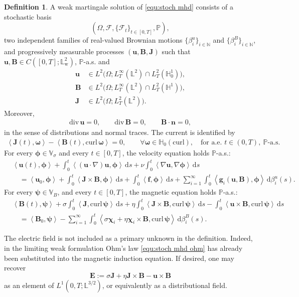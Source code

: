 \documentclass[11pt, reqno]{amsart}
\theoremstyle{definition}
\newtheorem{definition}[theorem]{Definition}
\numberwithin{equation}{section}
\newcommand{\curl}{\mathrm{curl}\,}
\newcommand{\divg}{\mathrm{div}\,}
\newcommand{\bff}{\boldsymbol}
\newcommand{\bb}{\mathbb}
\newcommand{\ds}{\,\mathrm{d}s}
\newcommand{\dbeta}{\mathrm{d}\beta}
\newcommand{\inpro}[2]{\left\langle#1,#2\right\rangle}
\newcommand{\hzerocurl}{\mathbb{H}_0(\mathrm{curl})}
\begin{document}
\begin{definition}\label{def:weak sol}
A weak martingale solution of \eqref{equ:stoch mhd} consists of a stochastic
basis
\[
(\Omega,\mathscr F,\{\mathscr F_t\}_{t\in[0,T]},\bb P),
\]
two independent families of real-valued Brownian motions $\{\beta_i^u\}_{i\in\bb{N}}$ and $\{\beta_i^B\}_{i\in\bb{N}}$,
and progressively measurable processes $(\bff u,\bff B,\bff J)$ such that $\bff{u},\bff{B} \in C([0,T];\bb L^2_{\mathrm w})$, $\bb{P}$-a.s. and
\begin{subequations}
\begin{alignat*}{1}
	\bff u&\in
	L^2\bigl(\Omega;L^\infty_T(\bb L^2)\cap L^2_T(\bb H_0^1)\bigr),
	\\
	\bff B&\in
	L^2\bigl(\Omega;L^\infty_T(\bb L^2)\cap L^2_T(\bb H^1)\bigr),
	\\
	\bff J&\in L^2\bigl(\Omega;L^2_T(\bb L^2)\bigr).
\end{alignat*}
\end{subequations}
Moreover,
\begin{align*}
	\divg\bff u=0,
	\qquad
	\divg\bff B=0,
	\qquad
	\bff B\cdot\bff n=0,
\end{align*}
in the sense of distributions and normal traces. The current is identified by
\begin{align*}
	\inpro{\bff J(t)}{\bff\omega}
	-
	\inpro{\bff B(t)}{\curl\bff\omega}
	=0,
	\qquad
	\forall\bff\omega\in\hzerocurl,
	\quad
	\text{for a.e. }t\in(0,T),\ \bb P\text{-a.s.}
\end{align*}
For every $\bff\phi\in\bb V_\sigma$ and every $t\in[0,T]$, the velocity equation
holds $\bb P$-a.s.:
\begin{align}
	\label{equ:mart u}
	&\inpro{\bff u(t)}{\bff\phi}
	+\int_0^t\inpro{(\bff u\cdot\nabla)\bff u}{\bff\phi}\ds
	+\nu\int_0^t\inpro{\nabla\bff u}{\nabla\bff\phi}\ds
	\nonumber\\
	&\quad=
	\inpro{\bff u_0}{\bff\phi}
	+\int_0^t\inpro{\bff J\times\bff B}{\bff\phi}\ds
	+\int_0^t\inpro{\bff f}{\bff\phi}\ds
	+\sum_{i=1}^{\infty}
	\int_0^t
	\inpro{\bff g_i(\bff u,\bff B)}{\bff\phi}
	\,\dbeta_i^u(s).
\end{align}
For every $\bff\psi \in\bb{V}_B$,
and every $t\in[0,T]$, the magnetic equation holds $\bb P$-a.s.:
\begin{align}
	\label{equ:mart B}
	&\inpro{\bff B(t)}{\bff\psi}
	+\sigma\int_0^t\inpro{\bff J}{\curl\bff\psi}\ds
	+\eta\int_0^t\inpro{\bff J\times\bff B}{\curl\bff\psi}\ds
	-\int_0^t\inpro{\bff u\times\bff B}{\curl\bff\psi}\ds
	\nonumber\\
	&\quad=
	\inpro{\bff B_0}{\bff\psi}
	-\sum_{i=1}^{\infty}
	\int_0^t
	\inpro{\sigma\bff\chi_i+\eta\bff\chi_i\times\bff B}{\curl\bff\psi}
	\,\dbeta_i^B(s).
\end{align}
\end{definition}
The electric field is not included as a primary unknown in the definition.
Indeed, in the limiting weak formulation Ohm's law \eqref{equ:stoch mhd ohm} has already been
substituted into the magnetic induction equation. If desired, one may recover
\[
\bff E
:=
\sigma\bff J+\eta\bff J\times\bff B-\bff u\times\bff B
\]
as an element of $L^1(0,T;\bb L^{3/2})$, or equivalently as a distributional field.
\end{document}
